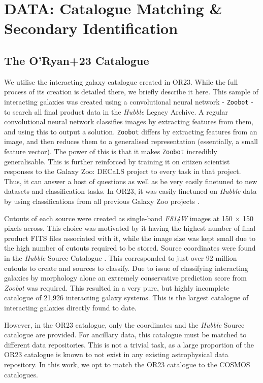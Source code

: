 \documentclass[fleqn,usenatbib]{mnras}
\begin{document}
\section{DATA: Catalogue Matching \& Secondary Identification} \label{data}
\subsection{The O'Ryan+23 Catalogue}
\noindent We utilise the interacting galaxy catalogue created in OR23. While the full process of its creation is detailed there, we briefly describe it here. This sample of interacting galaxies was created using a convolutional neural network - \texttt{Zoobot} - to search all final product data in the \textit{Hubble} Legacy Archive. A regular convolutional neural network classifies images by extracting features from them, and using this to output a solution. \texttt{Zoobot} differs by extracting features from an image, and then reduces them to a generalised representation (essentially, a small feature vector). The power of this is that it makes \texttt{Zoobot} incredibly generalisable. This is further reinforced by training it on citizen scientist responses to the Galaxy Zoo: DECaLS \citep{2022MNRAS.509.3966W} project to every task in that project. Thus, it can answer a host of questions as well as be very easily finetuned to new datasets and classification tasks. In OR23, it was easily finetuned on \textit{Hubble} data by using classifications from all previous Galaxy Zoo projects \citep{2008MNRAS.389.1179L}.

Cutouts of each source were created as single-band \textit{F814W} images at 150 $\times$ 150 pixels across. This choice was motivated by it having the highest number of final product FITS files associated with it, while the image size was kept small due to the high number of cutouts required to be stored. Source coordinates were found in the \textit{Hubble} Source Catalogue \citep{2016AJ....151..134W}. This corresponded to just over 92 million cutouts to create and sources to classify. Due to issue of classifying interacting galaxies by morphology alone an extremely conservative prediction score from \textit{Zoobot} was required. This resulted in a very pure, but highly incomplete catalogue of 21,926 interacting galaxy systems. This is the largest catalogue of interacting galaxies directly found to date.

However, in the OR23 catalogue, only the coordinates and the \textit{Hubble} Source catalogue are provided. For ancillary data, this catalogue must be matched to different data repositories. This is not a trivial task, as a large proportion of the OR23 catalogue is known to not exist in any existing astrophysical data repository. In this work, we opt to match the OR23 catalogue to the COSMOS catalogues.
\end{document}
